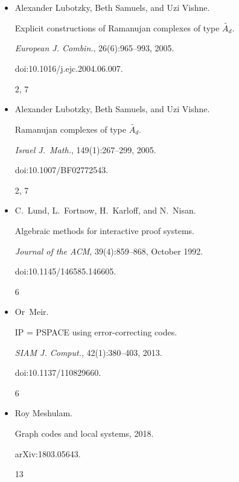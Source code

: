\begin{itemize}
doi:10.1109/FOCS.2018.00062.


7




\item[] 
[24]

Alexander Lubotzky, Beth Samuels, and Uzi Vishne.


Explicit constructions of Ramanujan complexes of type
$\tilde{A_{d}}$.


\emph{European J. Combin.}, 26(6):965–993, 2005.


doi:10.1016/j.ejc.2004.06.007.


2, 7




\item[] 
[25]

Alexander Lubotzky, Beth Samuels, and Uzi Vishne.


Ramanujan complexes of type $\tilde{A_{d}}$.


\emph{Israel J. Math.}, 149(1):267–299, 2005.


doi:10.1007/BF02772543.


2, 7




\item[] 
[26]

C. Lund, L. Fortnow, H. Karloff, and N. Nisan.


Algebraic methods for interactive proof systems.


\emph{Journal of the ACM}, 39(4):859–868, October 1992.


doi:10.1145/146585.146605.


6




\item[] 
[27]

Or Meir.


IP = PSPACE using error-correcting codes.


\emph{SIAM J. Comput.}, 42(1):380–403, 2013.


doi:10.1137/110829660.


6




\item[] 
[28]

Roy Meshulam.


Graph codes and local systems, 2018.


arXiv:1803.05643.


13





\end{itemize}
